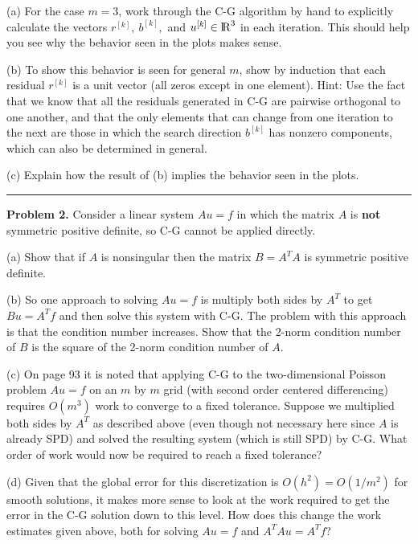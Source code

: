 \documentclass[10pt]{article}
\begin{document}
\newpage
(a) For the case $m=3$, work through the C-G algorithm by hand to explicitly
calculate the vectors $r^{[k]},~b^{[k]},$ and $u^{[k]} \in {{\rm l} \kern -.15em {\rm R} }^3$ in
each iteration.  This should help you see why the behavior seen in
the plots makes sense.

(b) To show this behavior is seen for general $m$, show by induction that each
residual $r^{[k]}$ is a unit vector (all zeros except in one element). 
Hint: Use the fact that we know that all the residuals generated in C-G
are pairwise orthogonal to one another, and that the only elements that can
change from one iteration to the next are those in which the search direction
$b^{[k]}$ has nonzero components, which can also be determined in general.

(c) Explain how the result of (b) implies the behavior seen in the plots.



\vskip 1cm
\hrule
{\bf Problem 2.}
Consider a linear system $Au=f$ in which the matrix $A$ is {\bf not} symmetric
positive definite, so C-G cannot be applied directly.

(a) Show that if $A$ is nonsingular then the matrix $B = A^TA$ is symmetric
positive definite.

(b) So one approach to solving $Au = f$ is multiply both sides by $A^T$ to get
$Bu = A^Tf$ and then solve this system with C-G.  The problem with this approach 
is that the condition number increases.  Show that the 2-norm condition
number of $B$ is the square of the 2-norm condition number of $A$.

(c) On page 93 it is noted that applying C-G to the two-dimensional Poisson
problem $Au = f$ on an $m$ by $m$ grid (with second order centered differencing) 
requires $O(m^3)$ work to converge to a fixed
tolerance.  Suppose we multiplied both sides by $A^T$ as described above (even 
though not necessary here since $A$ is already SPD) and solved the resulting
system (which is still SPD) by C-G.  What order of work would now be required
to reach a fixed tolerance?  

(d) Given that the global error for this discretization is $O(h^2) = O(1/m^2)$
for smooth solutions, it makes more sense to look at the work required to
get the error in the C-G solution down to this level.  How does this change
the work estimates given above, both for solving $Au=f$ and $A^TAu = A^Tf$? 
\end{document}

